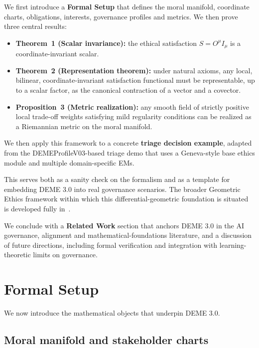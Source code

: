 \documentclass[12pt]{article}
\theoremstyle{remark}
\begin{document}
We first introduce a \textbf{Formal Setup} that defines the moral manifold, coordinate charts, obligations, interests, governance profiles and metrics. We then prove three central results:

\begin{itemize}
    \item \textbf{Theorem~1 (Scalar invariance):} the ethical satisfaction $S = O^\mu I_\mu$ is a coordinate-invariant scalar.
    \item \textbf{Theorem~2 (Representation theorem):} under natural axioms, any local, bilinear, coordinate-invariant satisfaction functional must be representable, up to a scalar factor, as the canonical contraction of a vector and a covector.
    \item \textbf{Proposition~3 (Metric realization):} any smooth field of strictly positive local trade-off weights satisfying mild regularity conditions can be realized as a Riemannian metric on the moral manifold.
\end{itemize}

We then apply this framework to a concrete \textbf{triage decision example}, adapted from the DEMEProfileV03-based triage demo that uses a Geneva-style base ethics module and multiple domain-specific EMs.

This serves both as a sanity check on the formalism and as a template for embedding DEME 3.0 into real governance scenarios. The broader Geometric Ethics framework within which this differential-geometric foundation is situated is developed fully in~\cite{bond2026ge}.

We conclude with a \textbf{Related Work} section that anchors DEME 3.0 in the AI governance, alignment and mathematical-foundations literature, and a discussion of future directions, including formal verification and integration with learning-theoretic limits on governance.

\section{Formal Setup}

We now introduce the mathematical objects that underpin DEME 3.0.

\subsection{Moral manifold and stakeholder charts}
\end{document}
